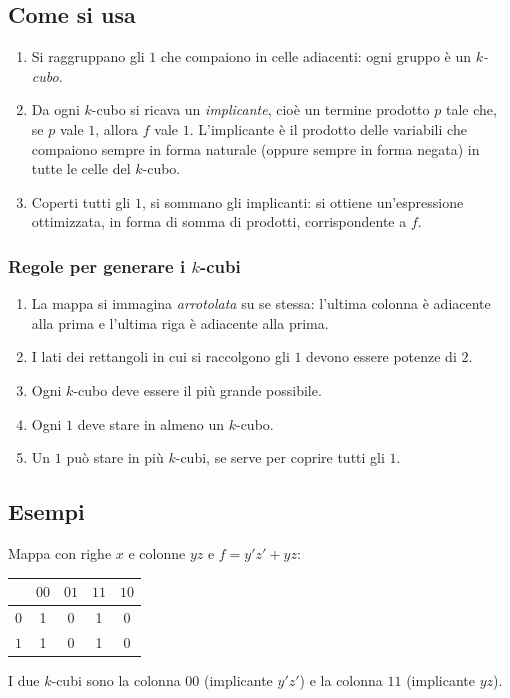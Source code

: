 \documentclass[11pt,a4paper]{article}
\begin{document}
\subsection{Come si usa}

\begin{enumerate}
    \item Si raggruppano gli $1$ che compaiono in celle adiacenti: ogni gruppo è un \emph{$k$-cubo}.
    \item Da ogni $k$-cubo si ricava un \emph{implicante}, cioè un termine prodotto $p$ tale che, se $p$ vale $1$, allora $f$ vale $1$. L'implicante è il prodotto delle variabili che compaiono sempre in forma naturale (oppure sempre in forma negata) in tutte le celle del $k$-cubo.
    \item Coperti tutti gli $1$, si sommano gli implicanti: si ottiene un'espressione ottimizzata, in forma di somma di prodotti, corrispondente a $f$.
\end{enumerate}

\subsubsection*{Regole per generare i $k$-cubi}

\begin{enumerate}
    \item La mappa si immagina \emph{arrotolata} su se stessa: l'ultima colonna è adiacente alla prima e l'ultima riga è adiacente alla prima.
    \item I lati dei rettangoli in cui si raccolgono gli $1$ devono essere potenze di $2$.
    \item Ogni $k$-cubo deve essere il più grande possibile.
    \item Ogni $1$ deve stare in almeno un $k$-cubo.
    \item Un $1$ può stare in più $k$-cubi, se serve per coprire tutti gli $1$.
\end{enumerate}

\subsection{Esempi}

\begin{esempio}
Mappa con righe $x$ e colonne $yz$ e $f = y'z' + yz$:
\begin{center}
\begin{tabular}{c|cccc}
 & $00$ & $01$ & $11$ & $10$ \\
\midrule
$0$ & 1 & 0 & 1 & 0 \\
$1$ & 1 & 0 & 1 & 0 \\
\end{tabular}
\end{center}
I due $k$-cubi sono la colonna $00$ (implicante $y'z'$) e la colonna $11$ (implicante $yz$).
\end{esempio}
\end{document}
